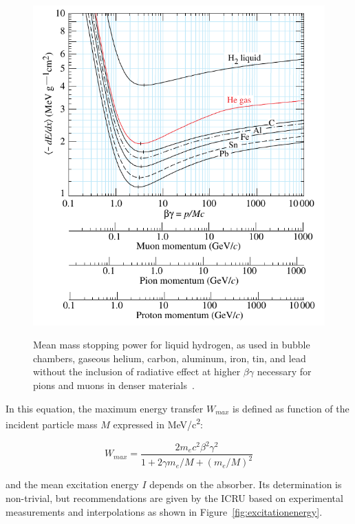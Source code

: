 \begingroup\setlength{\intextsep}{0pt}\setlength{\columnsep}{15pt}
	
	\begin{figure}
		\centering
		\includegraphics[width = \linewidth]{fig/chapt3/dedx_table_98.pdf}\\
		\caption{\label{fig:enerlyloss} Mean mass stopping power for liquid hydrogen, as used in bubble chambers, gaseous helium, carbon, aluminum, iron, tin, and lead without the inclusion of radiative effect at higher $\beta\gamma$ necessary for pions and muons in denser materials~\cite{PDG2018}.}
	\end{figure}
	
	In this equation, the maximum energy transfer $W_{max}$ is defined as function of the incident particle mass $M$ expressed in \si{MeV/c^2}:
	
	\begin{equation}
	\label{eq:maxenergytrans}
	W_{max} = \frac{2m_ec^2\beta^2\gamma^2}{1 + 2\gamma m_e/M + (m_e/M)^2}
	\end{equation}
	
	and the mean excitation energy $I$ depends on the absorber. Its determination is non-trivial, but recommendations are given by the \acf{ICRU} based on experimental measurements and interpolations as shown in Figure~\ref{fig:excitationenergy}.
	
